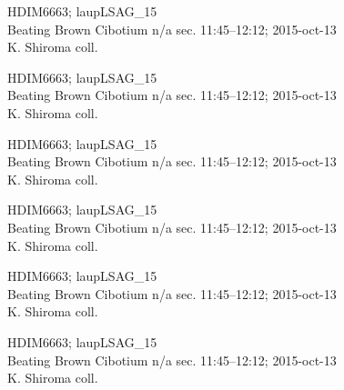 \documentclass[2pt]{extarticle}
\begin{document}
\noindent
\parbox{0.16\textwidth}{\tiny \raggedright \rule[-0.3\baselineskip]{0pt}{10pt}HDIM6663; laupLSAG\_15\\ Beating Brown Cibotium n/a sec. 11:45--12:12; 2015-oct-13\\ K. Shiroma coll.}
\parbox{0.16\textwidth}{\tiny \raggedright \rule[-0.3\baselineskip]{0pt}{10pt}HDIM6663; laupLSAG\_15\\ Beating Brown Cibotium n/a sec. 11:45--12:12; 2015-oct-13\\ K. Shiroma coll.}
\parbox{0.16\textwidth}{\tiny \raggedright \rule[-0.3\baselineskip]{0pt}{10pt}HDIM6663; laupLSAG\_15\\ Beating Brown Cibotium n/a sec. 11:45--12:12; 2015-oct-13\\ K. Shiroma coll.}
\parbox{0.16\textwidth}{\tiny \raggedright \rule[-0.3\baselineskip]{0pt}{10pt}HDIM6663; laupLSAG\_15\\ Beating Brown Cibotium n/a sec. 11:45--12:12; 2015-oct-13\\ K. Shiroma coll.}
\parbox{0.16\textwidth}{\tiny \raggedright \rule[-0.3\baselineskip]{0pt}{10pt}HDIM6663; laupLSAG\_15\\ Beating Brown Cibotium n/a sec. 11:45--12:12; 2015-oct-13\\ K. Shiroma coll.}
\parbox{0.16\textwidth}{\tiny \raggedright \rule[-0.3\baselineskip]{0pt}{10pt}HDIM6663; laupLSAG\_15\\ Beating Brown Cibotium n/a sec. 11:45--12:12; 2015-oct-13\\ K. Shiroma coll.} \\ 
\vspace{0.001in} 
\end{document}
